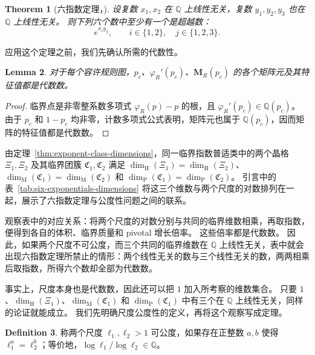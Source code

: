 \documentclass[scheme=plain,11pt]{ctexart}
\newtheorem{theorem}{Theorem}[section]
\newtheorem{lemma}[theorem]{Lemma}
\theoremstyle{definition}
\newtheorem{definition}[theorem]{Definition}
\theoremstyle{remark}
\newcommand{\dimhaus}{\dim_{\mathrm H}}
\newcommand{\dimmass}{\dim_{\mathrm M}}
\begin{document}
\begin{theorem}[六指数定理，\cite{dasgupta2021transcendence}]\label{thm:six-exponentials}
设复数 $x_1,x_2$ 在 $\mathbb Q$ 上线性无关，复数 $y_1,y_2,y_3$ 也在 $\mathbb Q$ 上线性无关。
则下列六个数中至少有一个是超越数：
\[
 e^{x_i y_j},\qquad i\in\{1,2\},\quad j\in\{1,2,3\}.
\]
\end{theorem}

应用这个定理之前，我们先确认所需的代数性。
\begin{lemma}\label{lem:algebraicity}
对于每个容许规则图，$p_c$、$\varphi_R'(p_c)$、$\mathbf M_R(p_c)$ 的各个矩阵元及其特征值都是代数数。
\end{lemma}
\begin{proof}
临界点是非零整系数多项式 $\varphi_R(p)-p$ 的根，且 $\varphi_R'(p_c)\in\mathbb Q(p_c)$。
由于 $p_c$ 和 $1-p_c$ 均非零，计数多项式公式表明，矩阵元也属于 $\mathbb Q(p_c)$，因而矩阵的特征值都是代数数。
\end{proof}

由定理~\ref{thm:exponent-class-dimensions}，同一临界指数普适类中的两个晶格 $\Xi_1,\Xi_2$ 及其临界团簇 $\mathfrak C_1,\mathfrak C_2$ 满足 $\dimhaus(\Xi_1)=\dimhaus(\Xi_2)$、$\dimmass(\mathfrak C_1)=\dimmass(\mathfrak C_2)$ 和 $\dim_{\mathrm P}(\mathfrak C_1)=\dim_{\mathrm P}(\mathfrak C_2)$。
引言中的表~\ref{tab:six-exponentials-dimensions} 将这三个维数与两个尺度的对数排列在一起，展示了六指数定理与公度性问题之间的联系。

观察表中的对应关系：将两个尺度的对数分别与共同的临界维数相乘，再取指数，便得到各自的体积、临界质量和 pivotal 增长倍率。
这些倍率都是代数数。
因此，如果两个尺度不可公度，而三个共同的临界维数在 $\mathbb Q$ 上线性无关，表中就会出现六指数定理所禁止的情形：两个线性无关的数与三个线性无关的数，两两相乘后取指数，所得六个数却全部为代数数。

事实上，尺度本身也是代数数，因此还可以把 $1$ 加入所考察的维数集合。
只要 $1$、$\dimhaus(\Xi_1)$、$\dimmass(\mathfrak C_1)$ 和 $\dim_{\mathrm P}(\mathfrak C_1)$ 中有三个在 $\mathbb Q$ 上线性无关，同样的论证就能成立。
我们先明确尺度公度性的定义，再将这个观察写成定理。

\begin{definition}\label{def:commensurate}
称两个尺度 $\ell_1,\ell_2>1$ 可公度，如果存在正整数 $a,b$ 使得 $\ell_1^a=\ell_2^b$；等价地，$\log\ell_1/\log\ell_2\in\mathbb Q$。
\end{definition}
\end{document}
